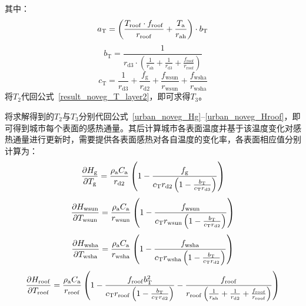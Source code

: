 %
其中：
\begin{equation}
  a_{\mathrm{T}} = \left(\frac{T_{\mathrm{roof}} \cdot f_{\mathrm{roof}}}{r_{\mathrm{roof}}} + \frac{T_{\rm a}}{r_{\mathrm{ah}}}\right) \cdot b_{\mathrm{T}}
\end{equation}
%
\begin{equation}
  b_{\mathrm{T}} = \frac{1}{r_{\mathrm{d3}} \cdot \left(\frac{1}{r_{\mathrm{ah}}} + \frac{1}{r_{\mathrm{d3}}} + \frac{f_{\mathrm{roof}}}{r_{\mathrm{roof}}} \right)}
\end{equation}
%
\begin{equation}
  c_{\mathrm{T}} = \frac{1}{r_{\mathrm{d3}}} + \frac{f_{\mathrm{g}}}{r_{\mathrm{d2}}} + \frac{f_{\mathrm{wsun}}}{r_{\mathrm{wsun}}} + \frac{f_{\mathrm{wsha}}}{r_{\mathrm{wsha}}}
\end{equation}
将$T_{\mathrm{2}}$代回公式~\eqref{result_noveg_T_layer2}，即可求得$T_{3}$。

将求解得到的$T_{2}$与$T_{3}$分别代回公式~\eqref{urban_noveg_Hg}--\eqref{urban_noveg_Hroof}，即可得到城市每个表面的感热通量。其后计算城市各表面温度并基于该温度变化对感热通量进行更新时，需要提供各表面感热对各自温度的变化率，各表面相应值分别计算为：
\begin{equation}
  \frac{\partial H_{\mathrm{g}}}{\partial T_{\mathrm{g}}} = \frac{\rho _{\rm a} C_{\mathrm a}}{r_{\mathrm{d2}}} \left(1-\frac{f_{\rm g}}{c_{\mathrm{T}} r_{\mathrm{d2}} \left(1-\frac{b_{\mathrm {T}} }{c_{\mathrm{T}} r_{\mathrm{d3}}}\right)}\right)
\end{equation}
%
\begin{equation}
  \frac{\partial H_{\mathrm{wsun}}}{\partial T_{\mathrm{wsun}}} = \frac{\rho _{\rm a} C_{\mathrm a}}{r_{\mathrm{wsun}}} \left(1-\frac{f_{\mathrm{wsun}}}{c_{\mathrm{T}} r_{\mathrm{wsun}} \left(1-\frac{b_{\mathrm {T}} }{c_{\mathrm{T}} r_{\mathrm{d2}}}\right)}\right)
\end{equation}
%
\begin{equation}
  \frac{\partial H_{\mathrm{wsha}}}{\partial T_{\mathrm{wsha}}} = \frac{\rho _{\rm a} C_{\mathrm a}}{r_{\mathrm{wsha}}} \left(1-\frac{f_{\mathrm{wsha}}}{c_{\mathrm{T}} r_{\mathrm{wsha}} \left(1-\frac{b_{\mathrm {T}} }{c_{\mathrm{T}} r_{\mathrm{d2}}}\right)}\right)
\end{equation}
%
\begin{equation}
  \frac{\partial H_{\mathrm{roof}}}{\partial T_{\mathrm{roof}}} = \frac{\rho _{\rm a} C_{\mathrm a}}{r_{\mathrm{roof}}} \left(1-\frac{f_{\mathrm{roof}} b_{\mathrm{T}}^2}{c_{\mathrm{T}} r_{\mathrm{roof}} \left(1-\frac{b_{\mathrm {T}} }{c_{\mathrm{T}} r_{\mathrm{d2}}}\right)}-\frac{f_{\mathrm{roof}}}{r_{\mathrm{roof}}\left(\frac{1}{r_{\mathrm{ah}}}+\frac{1}{r_{\mathrm{d2}}}+\frac{f_{\mathrm{roof}}}{r_{\mathrm{roof}}}\right)}\right)
\end{equation}

